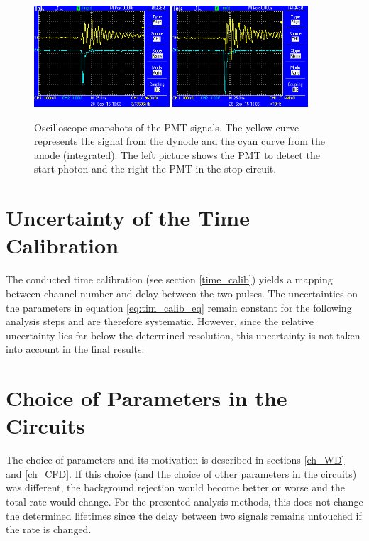 \documentclass[
	paper=A4,
	parskip=full,
	chapterprefix=true,
	11pt,
	headings=normal,
	bibliography=totoc,
	listof=totoc,
	titlepage=on,
]{scrreprt}
\begin{document}
\begin{figure}
	\centering
	\includegraphics[width=0.45\textwidth]{../images/gate_vs_dynode/F0003TEK.png}
	\includegraphics[width=0.45\textwidth]{../images/gate_vs_dynode/F0004TEK.png}
	\caption{Oscilloscope snapshots of the PMT signals. The yellow curve represents the signal from the dynode and the cyan curve from the anode (integrated). The left picture shows the PMT to detect the start photon and the right the PMT in the stop circuit.}
	\label{fig:pmt_signals}
\end{figure}

\section{Uncertainty of the Time Calibration}
The conducted time calibration (see section \ref{time_calib}) yields a mapping between channel number and delay between the two pulses. The uncertainties on the parameters in equation \ref{eq:tim_calib_eq} remain constant for the following analysis steps and are therefore systematic. However, since the relative uncertainty lies far below the determined resolution, this uncertainty is not taken into account in the final results. 

\section{Choice of Parameters in the Circuits}
The choice of parameters and its motivation is described in sections \ref{ch_WD} and \ref{ch_CFD}. If this choice (and the choice of other parameters in the circuits) was different, the background rejection would become better or worse and the total rate would change. For the presented analysis methods, this does not change the determined lifetimes since the delay between two signals remains untouched if the rate is changed. 
\end{document}
